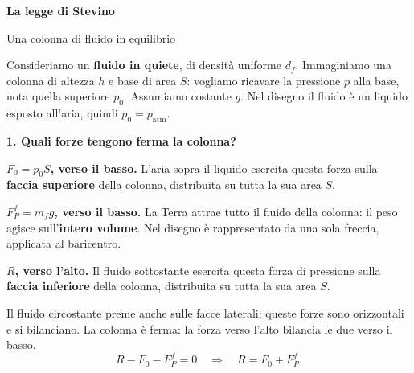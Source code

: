 \documentclass[11pt,a4paper]{article}
\begin{document}
{\LARGE\bfseries La legge di Stevino}\par
\vspace{2pt}
{\large Una colonna di fluido in equilibrio}
\vspace{8pt}

Consideriamo un \textbf{fluido in quiete}, di densità uniforme $d_f$.
Immaginiamo una colonna di altezza $h$ e base di area $S$: vogliamo
ricavare la pressione $p$ alla base, nota quella superiore $p_0$.
Assumiamo costante $g$. Nel disegno il fluido è un liquido esposto
all'aria, quindi $p_0=p_{\mathrm{atm}}$.

\vspace{5pt}
{\large\bfseries 1. Quali forze tengono ferma la colonna?}
\par\vspace{3pt}
\begin{minipage}[c]{0.36\textwidth}
\centering
{}
\end{minipage}\hfill
\begin{minipage}[c]{0.60\textwidth}
\textbf{$F_0=p_0S$, verso il basso.} L'aria sopra il liquido esercita
questa forza sulla \textbf{faccia superiore} della colonna, distribuita
su tutta la sua area $S$.

\textbf{$F_P^{f}=m_fg$, verso il basso.} La Terra attrae tutto il fluido
della colonna: il peso agisce sull'\textbf{intero volume}. Nel disegno
è rappresentato da una sola freccia, applicata al baricentro.

\textbf{$R$, verso l'alto.} Il fluido sottostante esercita questa
forza di pressione sulla \textbf{faccia inferiore} della colonna,
distribuita su tutta la sua area $S$.

Il fluido circostante preme anche sulle facce laterali;
queste forze sono orizzontali e si bilanciano.
La colonna è ferma: la forza verso l'alto bilancia le due verso il basso.
\[
 R-F_0-F_P^{f}=0
 \quad\Longrightarrow\quad
 \boxed{R=F_0+F_P^{f}}.
\]
\end{minipage}
\end{document}
